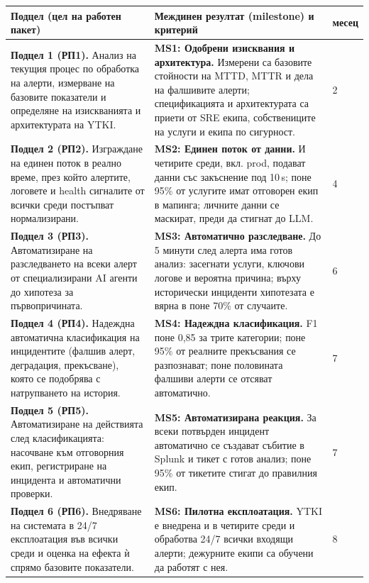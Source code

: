 \documentclass[11pt,a4paper]{article}
\begin{document}
\begin{table}[H]
\small
\begin{tabularx}{\linewidth}{@{}L{6.3cm}YC{1.1cm}@{}}
\toprule
\textbf{Подцел (цел на работен пакет)} & \textbf{Междинен резултат (milestone) и критерий} & \textbf{месец}\\
\midrule
\textbf{Подцел 1 (РП1).} Анализ на текущия процес по обработка на алерти, измерване на базовите показатели и определяне на изискванията и архитектурата на YTKI.
& \textbf{MS1: Одобрени изисквания и архитектура.} Измерени са базовите стойности на MTTD, MTTR и дела на фалшивите алерти; спецификацията и архитектурата са приети от SRE екипа, собствениците на услуги и екипа по сигурност.
& 2\\\addlinespace[5pt]
\textbf{Подцел 2 (РП2).} Изграждане на единен поток в реално време, през който алертите, логовете и health сигналите от всички среди постъпват нормализирани.
& \textbf{MS2: Единен поток от данни.} И четирите среди, вкл. prod, подават данни със закъснение под 10\,s; поне 95\% от услугите имат отговорен екип в мапинга; личните данни се маскират, преди да стигнат до LLM.
& 4\\\addlinespace[5pt]
\textbf{Подцел 3 (РП3).} Автоматизиране на разследването на всеки алерт от специализирани AI агенти до хипотеза за първопричината.
& \textbf{MS3: Автоматично разследване.} До 5 минути след алерта има готов анализ: засегнати услуги, ключови логове и вероятна причина; върху исторически инциденти хипотезата е вярна в поне 70\% от случаите.
& 6\\\addlinespace[5pt]
\textbf{Подцел 4 (РП4).} Надеждна автоматична класификация на инцидентите (фалшив алерт, деградация, прекъсване), която се подобрява с натрупването на история.
& \textbf{MS4: Надеждна класификация.} F1 поне 0,85 за трите категории; поне 95\% от реалните прекъсвания се разпознават; поне половината фалшиви алерти се отсяват автоматично.
& 7\\\addlinespace[5pt]
\textbf{Подцел 5 (РП5).} Автоматизиране на действията след класификацията: насочване към отговорния екип, регистриране на инцидента и автоматични проверки.
& \textbf{MS5: Автоматизирана реакция.} За всеки потвърден инцидент автоматично се създават събитие в Splunk и тикет с готов анализ; поне 95\% от тикетите стигат до правилния екип.
& 7\\\addlinespace[5pt]
\textbf{Подцел 6 (РП6).} Внедряване на системата в 24/7 експлоатация във всички среди и оценка на ефекта ѝ спрямо базовите показатели.
& \textbf{MS6: Пилотна експлоатация.} YTKI е внедрена и в четирите среди и обработва 24/7 всички входящи алерти; дежурните екипи са обучени да работят с нея.
& 8\\
\bottomrule
\end{tabularx}
\end{table}
\end{document}
